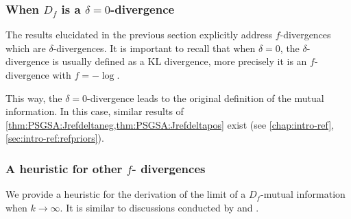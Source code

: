         \subsubsection{When $D_f$ is a $\delta=0$-divergence}

        The results elucidated in the previous section %
        explicitly address $f$-divergences which are $\delta$-divergences.
        It is important to recall that when $\delta=0$, the $\delta$-divergence is usually defined as a  $\text{KL}$ divergence, more precisely it is an $f$-divergence with $f=-\log$.

        This way, the $\delta=0$-divergence leads to the original definition of the mutual information.
        In this case, similar results of \cref{thm:PSGSA:Jrefdeltaneg,thm:PSGSA:Jrefdeltapos} exist (see \cref{chap:intro-ref}, \cref{sec:intro-ref:refpriors}). 
        



        \subsubsection{A heuristic for other $f$- divergences}

        We provide a heuristic for the derivation of the limit of a $D_f$-mutual information when $k\to\infty$. It is similar to discussions conducted by \citet{mure_objective_2018} and \citet{xie_minimax_1997}.

